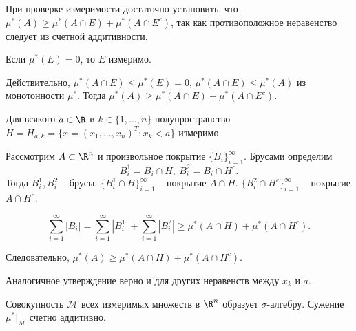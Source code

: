 
\begin{note}
    При проверке измеримости достаточно установить, что $\mu^{*}(A) \geq \mu^{*}(A \cap E) + \mu^{*}(A \cap E^{c})$, так как противоположное неравенство следует из счетной аддитивности.
\end{note}

\begin{example}
    Если $\mu^{*}(E) = 0$, то $E$ измеримо. 

    Действительно, $\mu^{*}(A \cap E) \leq \mu^{*}(E) = 0$, $\mu^{*}(A \cap E) \leq \mu^{*}(A)$ из монотонности $\mu^{*}$. Тогда $\mu^{*}(A) \geq \mu^{*}(A \cap E) + \mu^{*}(A \cap E^{c})$.
\end{example}

\begin{example}
    \label{lebeg-ex2}
    Для всякого $a \in \R$ и $k \in \{1, \ldots, n\}$ полупространство $H = H_{a, k} = \{x = (x_{1}, \ldots, x_{n})^{T}: x_{k} < a\}$ измеримо.

    Рассмотрим $A \subset \R^{n}$ и произвольное покрытие $\{B_{i}\}_{i = 1}^{\infty}$. Брусами определим
    \[B_{i}^{1} = B_{i} \cap H, \ B_{i}^{2} = B_{i} \cap H^{c}.\]
    Тогда $B_{i}^{1}, B_{i}^{2}$ -- брусы. $\{B_{i}^{1} \cap H\}_{i = 1}^{\infty}$ -- покрытие $A \cap H$. $\{B_{i}^{2} \cap H^{c}\}_{i = 1}^{\infty}$ -- покрытие $A \cap H^{c}$.

    \[\sum_{i = 1}^{\infty}|B_{i}| = \sum_{i = 1}^{\infty}|B_{i}^{1}| + \sum_{i = 1}^{\infty}|B_{i}^{2}| \geq \mu^{*}(A \cap H) + \mu^{*}(A \cap H^{c}).\]

    Следовательно, $\mu^{*}(A) \geq \mu^{*}(A \cap H) + \mu^{*}(A \cap H^{c})$.

    Аналогичное утверждение верно и для других неравенств между $x_{k}$ и $a$.
\end{example}

\begin{theorem}[Каратеодори]
    Совокупность $\mathcal{M}$ всех измеримых множеств в $\R^{n}$ образует $\sigma$-алгебру. Сужение $\mu^{*}\lvert_{\mathcal{M}}$ счетно аддитивно.
\end{theorem}

